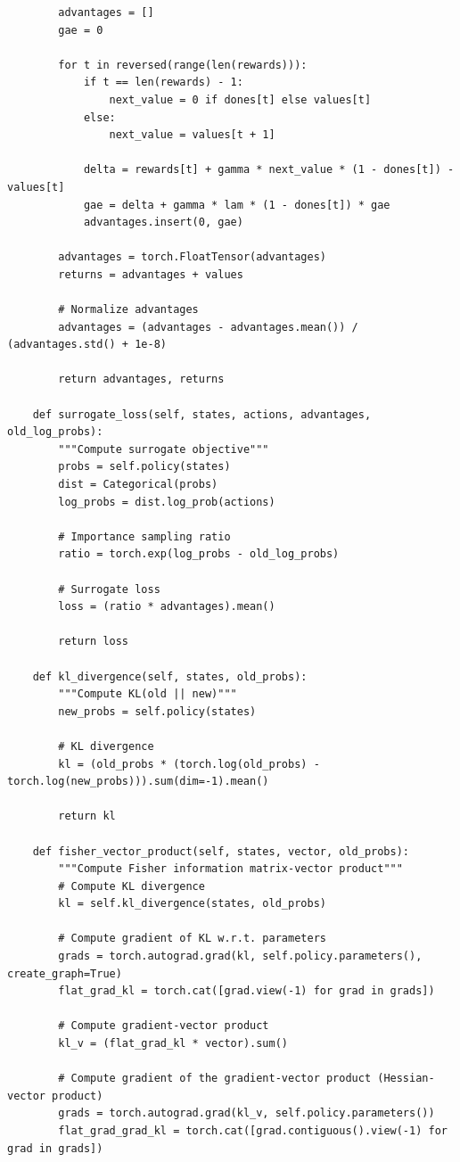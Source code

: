 \documentclass[12pt]{article}
\begin{document}
{{\begin{verbatim}
        advantages = []
        gae = 0

        for t in reversed(range(len(rewards))):
            if t == len(rewards) - 1:
                next_value = 0 if dones[t] else values[t]
            else:
                next_value = values[t + 1]

            delta = rewards[t] + gamma * next_value * (1 - dones[t]) - values[t]
            gae = delta + gamma * lam * (1 - dones[t]) * gae
            advantages.insert(0, gae)

        advantages = torch.FloatTensor(advantages)
        returns = advantages + values

        # Normalize advantages
        advantages = (advantages - advantages.mean()) / (advantages.std() + 1e-8)

        return advantages, returns

    def surrogate_loss(self, states, actions, advantages, old_log_probs):
        """Compute surrogate objective"""
        probs = self.policy(states)
        dist = Categorical(probs)
        log_probs = dist.log_prob(actions)

        # Importance sampling ratio
        ratio = torch.exp(log_probs - old_log_probs)

        # Surrogate loss
        loss = (ratio * advantages).mean()

        return loss

    def kl_divergence(self, states, old_probs):
        """Compute KL(old || new)"""
        new_probs = self.policy(states)

        # KL divergence
        kl = (old_probs * (torch.log(old_probs) - torch.log(new_probs))).sum(dim=-1).mean()

        return kl

    def fisher_vector_product(self, states, vector, old_probs):
        """Compute Fisher information matrix-vector product"""
        # Compute KL divergence
        kl = self.kl_divergence(states, old_probs)

        # Compute gradient of KL w.r.t. parameters
        grads = torch.autograd.grad(kl, self.policy.parameters(), create_graph=True)
        flat_grad_kl = torch.cat([grad.view(-1) for grad in grads])

        # Compute gradient-vector product
        kl_v = (flat_grad_kl * vector).sum()

        # Compute gradient of the gradient-vector product (Hessian-vector product)
        grads = torch.autograd.grad(kl_v, self.policy.parameters())
        flat_grad_grad_kl = torch.cat([grad.contiguous().view(-1) for grad in grads])


\end{verbatim}}}
\end{document}
